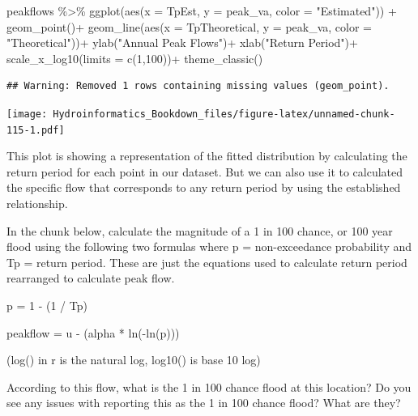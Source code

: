 \documentclass[
]{book}
\newenvironment{Shaded}{\begin{snugshade}}{\end{snugshade}}
\newcommand{\AttributeTok}[1]{\textcolor[rgb]{0.77,0.63,0.00}{#1}}
\newcommand{\DecValTok}[1]{\textcolor[rgb]{0.00,0.00,0.81}{#1}}
\newcommand{\FunctionTok}[1]{\textcolor[rgb]{0.00,0.00,0.00}{#1}}
\newcommand{\NormalTok}[1]{#1}
\newcommand{\SpecialCharTok}[1]{\textcolor[rgb]{0.00,0.00,0.00}{#1}}
\newcommand{\StringTok}[1]{\textcolor[rgb]{0.31,0.60,0.02}{#1}}
\begin{document}
\begin{Shaded}
\begin{Highlighting}[]
\NormalTok{peakflows }\SpecialCharTok{\%\textgreater{}\%} \FunctionTok{ggplot}\NormalTok{(}\FunctionTok{aes}\NormalTok{(}\AttributeTok{x =}\NormalTok{ TpEst, }\AttributeTok{y =}\NormalTok{ peak\_va, }\AttributeTok{color =} \StringTok{"Estimated"}\NormalTok{)) }\SpecialCharTok{+}
  \FunctionTok{geom\_point}\NormalTok{()}\SpecialCharTok{+}
  \FunctionTok{geom\_line}\NormalTok{(}\FunctionTok{aes}\NormalTok{(}\AttributeTok{x =}\NormalTok{ TpTheoretical, }\AttributeTok{y =}\NormalTok{ peak\_va, }\AttributeTok{color =} \StringTok{"Theoretical"}\NormalTok{))}\SpecialCharTok{+}
  \FunctionTok{ylab}\NormalTok{(}\StringTok{"Annual Peak Flows"}\NormalTok{)}\SpecialCharTok{+}
  \FunctionTok{xlab}\NormalTok{(}\StringTok{"Return Period"}\NormalTok{)}\SpecialCharTok{+}
  \FunctionTok{scale\_x\_log10}\NormalTok{(}\AttributeTok{limits =} \FunctionTok{c}\NormalTok{(}\DecValTok{1}\NormalTok{,}\DecValTok{100}\NormalTok{))}\SpecialCharTok{+}
  \FunctionTok{theme\_classic}\NormalTok{()}
\end{Highlighting}
\end{Shaded}

\begin{verbatim}
## Warning: Removed 1 rows containing missing values (geom_point).
\end{verbatim}

\texttt{[image: Hydroinformatics\_Bookdown\_files/figure-latex/unnamed-chunk-115-1.pdf]}

This plot is showing a representation of the fitted distribution by calculating the return period for each point in our dataset. But we can also use it to calculated the specific flow that corresponds to any return period by using the established relationship.

In the chunk below, calculate the magnitude of a 1 in 100 chance, or 100 year flood using the following two formulas where p = non-exceedance probability and Tp = return period. These are just the equations used to calculate return period rearranged to calculate peak flow.

p = 1 - (1 / Tp)

peakflow = u - (alpha * ln(-ln(p)))

(log() in r is the natural log, log10() is base 10 log)

According to this flow, what is the 1 in 100 chance flood at this location? Do you see any issues with reporting this as the 1 in 100 chance flood? What are they?
\end{document}
